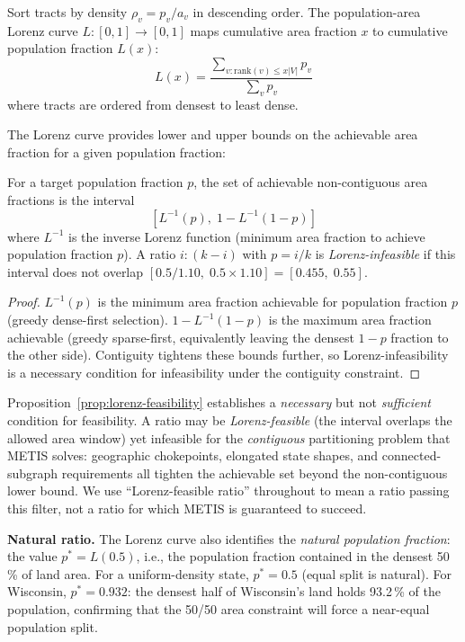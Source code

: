 \begin{definition}
Sort tracts by density $\rho_v = p_v / a_v$ in descending order.
The population-area Lorenz curve $L : [0,1] \to [0,1]$ maps cumulative area
fraction $x$ to cumulative population fraction $L(x)$:
\[
  L(x) = \frac{\sum_{v : \mathrm{rank}(v) \leq x|V|} p_v}{\sum_v p_v}
\]
where tracts are ordered from densest to least dense.
\end{definition}

The Lorenz curve provides lower and upper bounds on the achievable area fraction
for a given population fraction:

\begin{proposition}
For a target population fraction $p$, the set of achievable non-contiguous
area fractions is the interval
\[
  [L^{-1}(p),\; 1 - L^{-1}(1-p)]
\]
where $L^{-1}$ is the inverse Lorenz function (minimum area fraction to
achieve population fraction $p$).
A ratio $i:(k-i)$ with $p = i/k$ is \emph{Lorenz-infeasible} if this interval
does not overlap $[0.5/1.10,\; 0.5 \times 1.10] = [0.455,\; 0.55]$.
\end{proposition}

\begin{proof}
$L^{-1}(p)$ is the minimum area fraction achievable for population fraction $p$
(greedy dense-first selection). $1 - L^{-1}(1-p)$ is the maximum area fraction
achievable (greedy sparse-first, equivalently leaving the densest $1-p$
fraction to the other side). Contiguity tightens these bounds further, so
Lorenz-infeasibility is a necessary condition for infeasibility under the
contiguity constraint.
\end{proof}

\begin{remark}
Proposition~\ref{prop:lorenz-feasibility} establishes a \emph{necessary} but
not \emph{sufficient} condition for feasibility.
A ratio may be \emph{Lorenz-feasible} (the interval overlaps the allowed area
window) yet infeasible for the \emph{contiguous} partitioning problem that METIS
solves: geographic chokepoints, elongated state shapes, and connected-subgraph
requirements all tighten the achievable set beyond the non-contiguous lower bound.
We use ``Lorenz-feasible ratio'' throughout to mean a ratio passing this filter,
not a ratio for which METIS is guaranteed to succeed.
\end{remark}

\noindent\textbf{Natural ratio.}
The Lorenz curve also identifies the \emph{natural population fraction}: the
value $p^* = L(0.5)$, i.e., the population fraction contained in the densest
50\,\% of land area.
For a uniform-density state, $p^* = 0.5$ (equal split is natural).
For Wisconsin, $p^* = 0.932$: the densest half of Wisconsin's land holds 93.2\,\%
of the population, confirming that the 50/50 area constraint will force a
near-equal population split.

